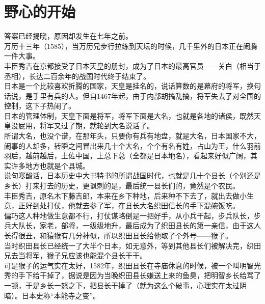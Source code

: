 \section{野心的开始}
\ifnum{}
	\begin{multicols}{\theparacolNo}
\fi
答案已经揭晓，原因却发生在七年之前。\\

万历十三年（1585），当万历兄步行拉练到天坛的时候，几千里外的日本正在闹腾一件大事。\\

丰臣秀吉在京都接受了日本天皇的册封，成为了日本的最高官员——关白（相当于丞相），长达二百余年的战国时代终于结束了。\\

日本是一个比较喜欢折腾的国家，天皇是挂名的，说话算数的是幕府的将军，换句话说，是手里有兵的人。但自1467年起，由于内部胡搞乱搞，将军失去了对全国的控制，这下子热闹了。\\

日本的管理体制，天皇下面是将军，将军下面是大名，也就是各地的诸侯，既然天皇没屁用，将军又过了期，就轮到大名说话了。\\

所谓大名，也没个谱，在那年头，只要你有兵有地盘，就是大名，日本国家不大，闹事的人却多，转瞬之间冒出来几十个大名，个个有名有姓，占山为王，什么羽前羽后，越前越后，土佐中国，上总下总（全都是日本地名），看起来好似广阔，其实许多地方也就是个县城。\\

说句寒酸话，日本历史中大书特书的所谓战国时代，也就是几十个县长（个别还是乡长）打来打去的历史，更讽刺的是，最后统一县长们的，竟然是个农民。\\

丰臣秀吉，原名木下藤吉郎，本来在乡下种地，后来种不下去了，就出去做小生意，正好到处打仗，他就去参了军，在县长大名织田信长的手下混碗饭吃。\\

偏巧这人种地做生意都不行，打仗谋略倒是一把好手，从小兵干起，步兵队长，步兵大队长，家老，部将，一级级地升，最后成为了织田县长的第一亲信，由于这人长得很丑，和猿猴有几分神似，所以织田县长给他取了个外号——猴子。\\

当时织田县长已经统一了大半个日本，如无意外，等到其他县长们被解决完，织田兄去当将军，猴子兄应该也能混个县长干干。\\

可是猴子的运气实在太好，1582年，织田县长在寺庙休息的时候，被一个叫明智光秀的手下给干掉了，据说是因为当晚织田县长嫌送上来的鱼臭，把明智乡长给骂了一顿，于是乡长一怒之下，把县长干掉了（就为这么个破事，心理实在太过阴暗）。日本史称“本能寺之变”。\\


\end{multicols}
